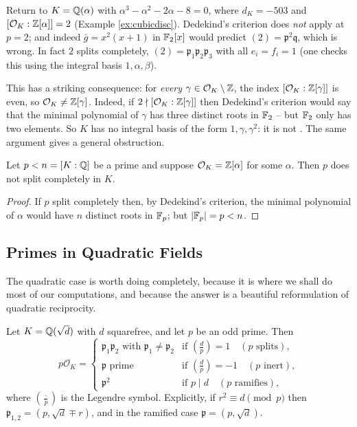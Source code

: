 \documentclass[a4paper]{scrartcl}
\renewcommand{\OO}{\mathcal{O}}
\newcommand{\fp}{\mathfrak{p}}
\newcommand{\fq}{\mathfrak{q}}
\newcommand{\legendre}[2]{\left( \frac{#1}{#2} \right)}
\begin{document}
\begin{example}\label{ex:nonmonogenic}
	Return to $K = \mathbb{Q}(\alpha)$ with $\alpha^3-\alpha^2-2\alpha-8 = 0$, where $d_K = -503$ and $[\OO_K:\Z[\alpha]] = 2$ (Example \ref{ex:cubicdisc}). Dedekind's criterion does \emph{not} apply at $p=2$; and indeed $\bar g = x^2(x+1)$ in $\mathbb{F}_2[x]$ would predict $(2) = \fp^2\fq$, which is wrong. In fact $2$ splits completely, $(2) = \fp_1\fp_2\fp_3$ with all $e_i = f_i = 1$ (one checks this using the integral basis $1, \alpha, \beta$).

	This has a striking consequence: for \emph{every} $\gamma \in \OO_K \setminus \Z$, the index $[\OO_K:\Z[\gamma]]$ is even, so $\OO_K \neq \Z[\gamma]$. Indeed, if $2 \nmid [\OO_K:\Z[\gamma]]$ then Dedekind's criterion would say that the minimal polynomial of $\gamma$ has three distinct roots in $\mathbb{F}_2$ -- but $\mathbb{F}_2$ only has two elements. So $K$ has no integral basis of the form $1,\gamma,\gamma^2$: it is not . The same argument gives a general obstruction.
\end{example}

\begin{corollary}
	Let $p < n = [K:\mathbb{Q}]$ be a prime and suppose $\OO_K = \Z[\alpha]$ for some $\alpha$. Then $p$ does not split completely in $K$.
\end{corollary}

\begin{proof}
	If $p$ split completely then, by Dedekind's criterion, the minimal polynomial of $\alpha$ would have $n$ distinct roots in $\mathbb{F}_p$; but $\lvert\mathbb{F}_p\rvert = p < n$.
\end{proof}

\subsection{Primes in Quadratic Fields}

The quadratic case is worth doing completely, because it is where we shall do most of our computations, and because the answer is a beautiful reformulation of quadratic reciprocity.

\begin{proposition}\label{prop:quadsplit}
	Let $K = \mathbb{Q}(\sqrt d)$ with $d$ squarefree, and let $p$ be an odd prime. Then
	$$p\OO_K = \begin{cases}
		\fp_1\fp_2 \text{ with } \fp_1 \neq \fp_2 & \text{if } \legendre{d}{p} = 1 \quad (\text{$p$ splits}),\\
		\fp \text{ prime} & \text{if } \legendre{d}{p} = -1 \quad (\text{$p$ inert}),\\
		\fp^2 & \text{if } p \mid d \quad (\text{$p$ ramifies}),
	\end{cases}$$
	where $\legendre{\cdot}{p}$ is the Legendre symbol. Explicitly, if $r^2 \equiv d \pmod p$ then $\fp_{1,2} = (p, \sqrt d \mp r)$, and in the ramified case $\fp = (p,\sqrt d)$.
\end{proposition}
\end{document}
